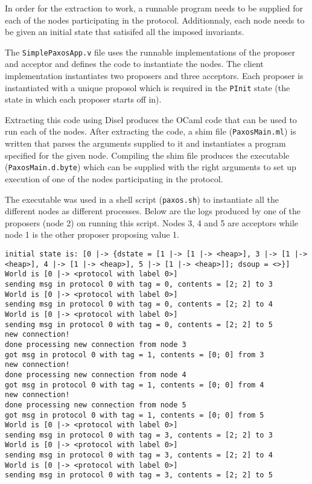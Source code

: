 In order for the extraction to work, a runnable program needs to be supplied for each of
the nodes participating in the protocol. Additionnaly, each node needs to
be given an initial state that satisifed all the imposed invariants.

The \texttt{SimplePaxosApp.v} file uses the runnable implementations of
the proposer and acceptor and defines the code to instantiate the nodes.
The client implementation instantiates two proposers and three acceptors.
Each proposer is instantiated with a unique proposol which is required in the
\texttt{PInit} state (the state in which each proposer starts off in).

Extracting this code using Disel produces the OCaml code
that can be used to run each of the nodes. After extracting the code,
a shim file (\texttt{PaxosMain.ml}) is written that parses the arguments
supplied to it and instantiates a program specified
for the given node. Compiling the shim file produces the executable (\texttt{PaxosMain.d.byte})
which can be supplied with the right arguments to set up execution of one
of the nodes participating in the protocol.

The executable was used in a shell script (\texttt{paxos.sh})
to instantiate all the different nodes as different processes.
Below are the logs produced by one of the
proposers (node 2) on running this script. Nodes 3, 4 and 5 are acceptors while
node 1 is the other proposer proposing value 1.

\begin{lstlisting}
initial state is: [0 |-> {dstate = [1 |-> [1 |-> <heap>], 3 |-> [1 |-> <heap>], 4 |-> [1 |-> <heap>], 5 |-> [1 |-> <heap>]]; dsoup = <>}]
World is [0 |-> <protocol with label 0>]
sending msg in protocol 0 with tag = 0, contents = [2; 2] to 3
World is [0 |-> <protocol with label 0>]
sending msg in protocol 0 with tag = 0, contents = [2; 2] to 4
World is [0 |-> <protocol with label 0>]
sending msg in protocol 0 with tag = 0, contents = [2; 2] to 5
new connection!
done processing new connection from node 3
got msg in protocol 0 with tag = 1, contents = [0; 0] from 3
new connection!
done processing new connection from node 4
got msg in protocol 0 with tag = 1, contents = [0; 0] from 4
new connection!
done processing new connection from node 5
got msg in protocol 0 with tag = 1, contents = [0; 0] from 5
World is [0 |-> <protocol with label 0>]
sending msg in protocol 0 with tag = 3, contents = [2; 2] to 3
World is [0 |-> <protocol with label 0>]
sending msg in protocol 0 with tag = 3, contents = [2; 2] to 4
World is [0 |-> <protocol with label 0>]
sending msg in protocol 0 with tag = 3, contents = [2; 2] to 5
\end{lstlisting}

